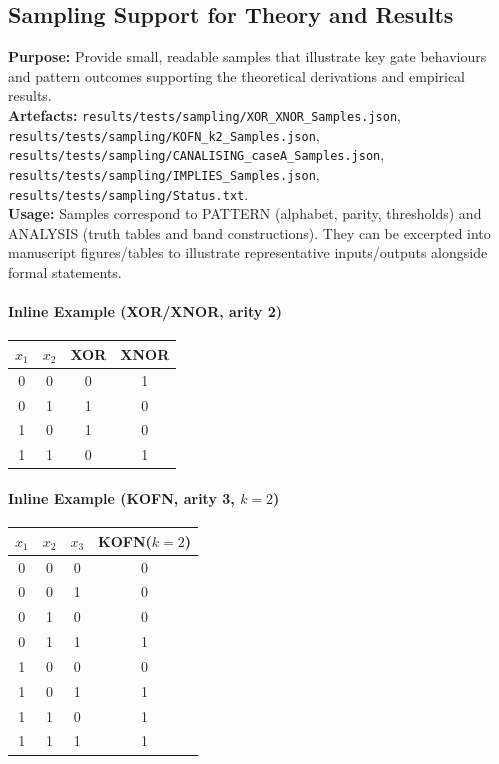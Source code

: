\documentclass{article}
\begin{document}
\subsection*{Sampling Support for Theory and Results}
\textbf{Purpose:} Provide small, readable samples that illustrate key gate behaviours and pattern outcomes supporting the theoretical derivations and empirical results.\\
\textbf{Artefacts:} \texttt{results/tests/sampling/XOR\_XNOR\_Samples.json}, \texttt{results/tests/sampling/KOFN\_k2\_Samples.json}, \texttt{results/tests/sampling/CANALISING\_caseA\_Samples.json}, \texttt{results/tests/sampling/IMPLIES\_Samples.json}, \texttt{results/tests/sampling/Status.txt}.\\
\textbf{Usage:} Samples correspond to PATTERN (alphabet, parity, thresholds) and ANALYSIS (truth tables and band constructions). They can be excerpted into manuscript figures/tables to illustrate representative inputs/outputs alongside formal statements.
\paragraph{Inline Example (XOR/XNOR, arity 2)}
\begin{center}
\begin{tabular}{cc|cc}
\toprule
$x_1$ & $x_2$ & XOR & XNOR \\
\midrule
0 & 0 & 0 & 1 \\
0 & 1 & 1 & 0 \\
1 & 0 & 1 & 0 \\
1 & 1 & 0 & 1 \\
\bottomrule
\end{tabular}
\end{center}
\paragraph{Inline Example (KOFN, arity 3, $k=2$)}
\begin{center}
\begin{tabular}{ccc|c}
\toprule
$x_1$ & $x_2$ & $x_3$ & KOFN($k=2$) \\
\midrule
0 & 0 & 0 & 0 \\
0 & 0 & 1 & 0 \\
0 & 1 & 0 & 0 \\
0 & 1 & 1 & 1 \\
1 & 0 & 0 & 0 \\
1 & 0 & 1 & 1 \\
1 & 1 & 0 & 1 \\
1 & 1 & 1 & 1 \\
\bottomrule
\end{tabular}
\end{center}
\end{document}
